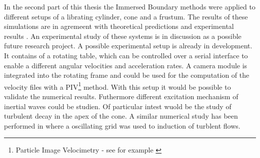 In the second part of this thesis the Immersed Boundary methods were applied to different setups of a librating cylinder, cone and a frustum.
The results of these simulations are in agremeent with theoretical
predictions \citep{Greenspan1969} and experimental results \cite{Beardsley1970}.
An experimental study of these systems is in discussion as a possible future research project.
A possible experimental setup is already in development.
It contains of a rotating table, which can be controlled over a serial interface to enable a different angular velocities and acceleration rates.
A camera module is integrated into the rotating frame and could be used for the computation
of the velocity files with a PIV\footnote{Particle Image Velocimetry  - see for example \citep{aie} }
method.
With this setup it would be possible to validate the numerical results.
Futhermore different excitation mechanism of inertial waves could be studien.
Of particular intest wuold be the study of turbulent decay in the apex of the cone.
A similar numerical study has been performed in \citep{} where a oscillating grid
was used to induction of turblent flows.




